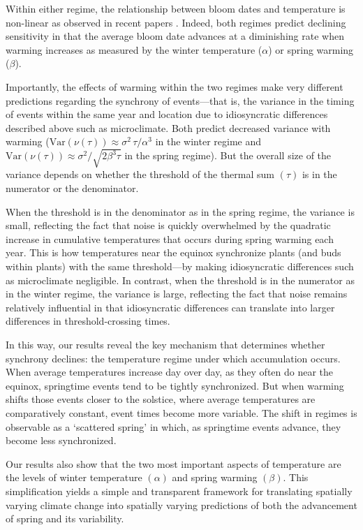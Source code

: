 \documentclass[
]{article}
\begin{document}
{Within either regime, the relationship between bloom dates and temperature is non-linear as observed in recent papers \citep{fu2015declining,wolkovich2021simple}. Indeed, both regimes predict declining sensitivity in that the average bloom date advances at a diminishing rate when warming increases as measured by the winter temperature ($\alpha$) or spring warming ($\beta$).

Importantly, the effects of warming within the two regimes make very different predictions regarding the synchrony of events---that is, the variance in the timing of events within the same year and location due to idiosyncratic differences described above such as microclimate. Both predict decreased variance with warming ($\mathrm{Var}(\nu(\tau)) \approx \sigma^2 \, \tau / \alpha^3$ in the winter regime and $\mathrm{Var}(\nu(\tau)) \approx \sigma^2 / \sqrt{2 \beta^{3} \tau}$ in the spring regime). But the overall size of the variance depends on whether the threshold of the thermal sum $(\tau)$ is in the numerator or the denominator.

When the threshold is in the denominator as in the spring regime, the variance is small, reflecting the fact that noise is quickly overwhelmed by the quadratic increase in cumulative temperatures that occurs during spring warming each year. This is how temperatures near the equinox synchronize plants (and buds within plants) with the same threshold---by making idiosyncratic differences such as microclimate negligible. In contrast, when the threshold is in the numerator as in the winter regime, the variance is large, reflecting the fact that noise remains relatively influential in that idiosyncratic differences can translate into larger differences in threshold-crossing times. 

In this way, our results reveal the key mechanism that determines whether synchrony declines: the temperature regime under which accumulation occurs. When average temperatures increase day over day, as they often do near the equinox, springtime events tend to be tightly synchronized. But when warming shifts those events closer to the solstice, where average temperatures are comparatively constant, event times become more variable. The shift in regimes is observable as a `scattered spring' in which, as springtime events advance, they become less synchronized. 

Our results also show that the two most important aspects of temperature are the levels of winter temperature $(\alpha)$ and spring warming $(\beta)$. This simplification yields a simple and transparent framework for translating spatially varying climate change into spatially varying predictions of both the advancement of spring and its variability. 

}
\end{document}
